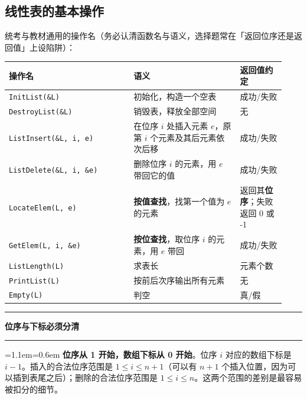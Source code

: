 \documentclass[11pt,openany,UTF8]{ctexbook}
\newcommand{\callouthead}[2]{%
  \par\addvspace{7pt}\noindent
  {\color{#1}\rule[-0.15em]{3pt}{1.05em}}\hspace{0.5em}%
  {\bfseries\color{#1}#2}\par\nobreak\vspace{-0.35em}%
  {\color{rulesep}\hrule height 0.4pt}\nobreak\vspace{0.45em}%
  \begingroup\small\setlength{\parindent}{0pt}%
  \leftskip=1.1em\rightskip=0.6em\noindent\ignorespaces}
\newcommand{\calloutend}{\par\endgroup\addvspace{7pt}}
\newenvironment{callwarn}[1]{\callouthead{warnbar}{#1}}{\calloutend}
\begin{document}
\subsection{线性表的基本操作}

统考与教材通用的操作名（务必认清函数名与语义，选择题常在「返回位序还是返回值」上设陷阱）：

\begingroup\small\setlength{\tabcolsep}{4.0pt}
\begin{longtable}{@{}L{0.4143\linewidth}L{0.3599\linewidth}L{0.1542\linewidth}@{}}
\toprule
\textbf{操作名} & \textbf{语义} & \textbf{返回值约定} \\
\midrule
\endhead
\texttt{InitList(\&L)\allowbreak{}} & 初始化，构造一个空表 & 成功/失败 \\
\texttt{DestroyList(\&L)\allowbreak{}} & 销毁表，释放全部空间 & 无 \\
\texttt{ListInsert(\&L,\allowbreak{} i,\allowbreak{} e)\allowbreak{}} & 在位序 $i$ 处插入元素 $e$，原第 $i$ 个元素及其后元素依次后移 & 成功/失败 \\
\texttt{ListDelete(\&L,\allowbreak{} i,\allowbreak{} \&e)\allowbreak{}} & 删除位序 $i$ 的元素，用 $e$ 带回它的值 & 成功/失败 \\
\texttt{LocateElem(L,\allowbreak{} e)\allowbreak{}} & \textbf{按值查找}，找第一个值为 $e$ 的元素 & 返回其\textbf{位序}；失败返回 0 或 -1 \\
\texttt{GetElem(L,\allowbreak{} i,\allowbreak{} \&e)\allowbreak{}} & \textbf{按位查找}，取位序 $i$ 的元素，用 $e$ 带回 & 成功/失败 \\
\texttt{ListLength(L)\allowbreak{}} & 求表长 & 元素个数 \\
\texttt{PrintList(L)\allowbreak{}} & 按前后次序输出所有元素 & 无 \\
\texttt{Empty(L)\allowbreak{}} & 判空 & 真/假 \\
\bottomrule
\end{longtable}
\endgroup

\begin{callwarn}{位序与下标必须分清}
\textbf{位序从 1 开始，数组下标从 0 开始}。位序 $i$ 对应的数组下标是 $i-1$。插入的合法位序范围是 $1 \le i \le n+1$（可以有 $n+1$ 个插入位置，因为可以插到表尾之后）；删除的合法位序范围是 $1 \le i \le n$。这两个范围的差别是最容易被扣分的细节。

\end{callwarn}
\end{document}
